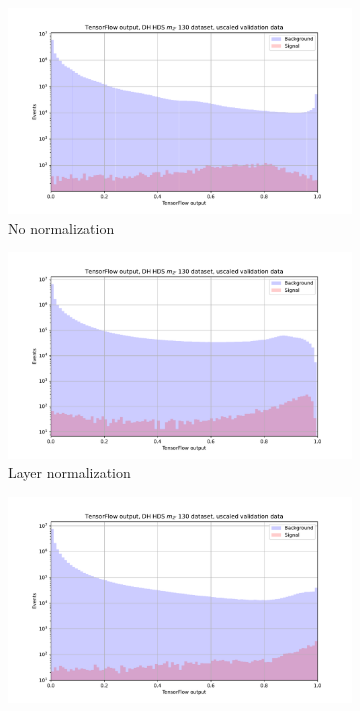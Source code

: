 \documentclass[14pt, a4paper]{book}
\begin{document}
\begin{figure}[!ht]
	\centering
	\begin{subfigure}[b]{0.49\textwidth}
      \centering
      \includegraphics[width=1\textwidth]{NO_NORM/VAL_unscaled.pdf}
      \caption{No normalization}
   \end{subfigure}
   \hfill
   \begin{subfigure}[b]{0.49\textwidth}
      \centering
      \includegraphics[width=1\textwidth]{Layer_norm/VAL_unscaled.pdf}
      \caption{Layer normalization}
   \end{subfigure}
   \hfill
	\begin{subfigure}[b]{0.49\textwidth}
      \centering
      \includegraphics[width=1\textwidth]{minmax/VAL_unscaled.pdf}

\end{subfigure}
\end{figure}
\end{document}
